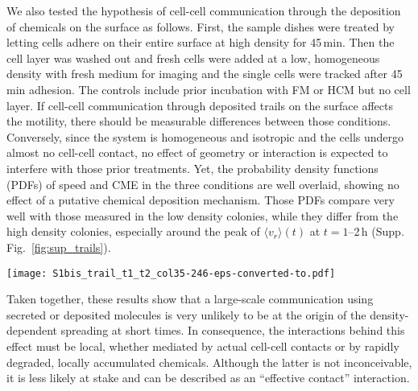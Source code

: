 \documentclass[11pt, twocolumn]{article}
\newcommand\rev[1]{{#1}}
\begin{document}
We also tested the hypothesis of cell-cell communication through
  the deposition of chemicals on the surface as follows. First, the
  sample dishes were treated by letting cells adhere on their entire surface at high density
  for 45\,min. Then the cell layer was washed out and fresh cells were
  added at a low, homogeneous density with fresh medium for imaging
  and the single cells were tracked after 45\,min adhesion. The controls
  include prior incubation with FM or HCM but no cell layer. If
  cell-cell communication through deposited trails on the surface
  affects the motility, there should be measurable differences between
  those conditions. Conversely, since the system is homogeneous and isotropic and the cells
  undergo almost no cell-cell contact, no effect of geometry or
  interaction is expected to interfere with those prior treatments.
  Yet, the probability density functions (PDFs) of speed and CME in the
  three conditions are well overlaid, showing no effect of a putative
  chemical deposition mechanism. Those PDFs compare very well with
  those measured in the low density colonies, while they differ
  from the high density colonies, especially
  around the peak of $\langle v_r\rangle(t)$ at $t=1$--2\,h 
  (Supp. Fig.~\ref{fig:sup_trails}).

\begin{figure*}[ht!]
\centering
\texttt{[image: S1bis\_trail\_t1\_t2\_col35-246-eps-converted-to.pdf]}

\caption{Modifications of the surface by the cells do not affect cell motility.\\
  Distribution of speed (left) and CME with $\Delta t=5\,$min (right)
  computed from trajectories with $\delta t=1\,$min, gathered for all times
  $t=0-1$\,h (top) and $t=1-2$\,h (bottom) with various surface treatments (solid lines) or in spreading colonies (dashed lines). Cells $\Rightarrow$ FM: cells
  were seeded at high density, let adhere for 45\,min and washed out
  before adding fresh cells in fresh medium (FM) for imaging. FM
  $\Rightarrow$ FM: the sample dish was filled with FM for 45\,min
  before cells and FM were added for imaging. HCM $\Rightarrow$ FM:
  the sample dish was filled with HCM for 45\,min before cells and FM
  were added for imaging.}
\label{fig:sup_trails}
\end{figure*}

Taken together, these results show that a large-scale communication
using secreted or deposited molecules is very unlikely to be at the
origin of the density-dependent spreading at short times. In
consequence, the interactions behind this effect must be local,
whether mediated by actual cell-cell contacts or by rapidly degraded,
locally accumulated chemicals. Although the latter is not
inconceivable, it is less likely at stake and can be described as an
``effective contact'' interaction.
\end{document}
